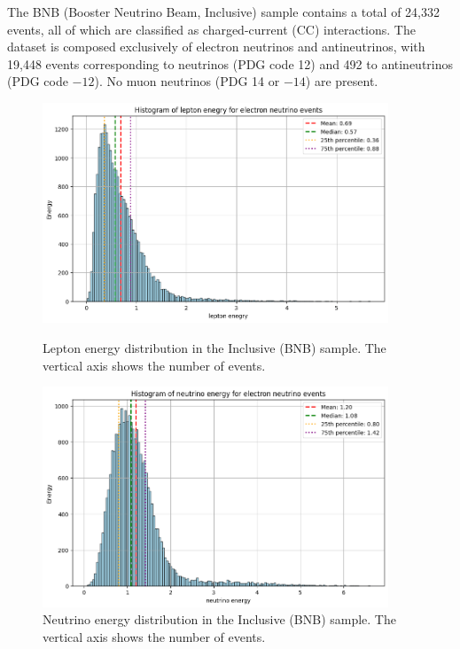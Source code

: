 \documentclass{pracalicmgr}
\begin{document}
The BNB (Booster Neutrino Beam, Inclusive) sample contains a total of 24,332 events, all of which are classified as charged-current (CC) interactions. The dataset is composed exclusively of electron neutrinos and antineutrinos, with 19,448 events corresponding to neutrinos (PDG code 12) and 492 to antineutrinos (PDG code $-12$). No muon neutrinos (PDG 14 or $-14$) are present.

\begin{figure}[H]
    \centering
    \begin{minipage}[t]{\textwidth}
    \centering
    \includegraphics[width=0.92\textwidth]{src/leptonElectron.png}
    \caption{Lepton energy distribution in the Inclusive (BNB) sample. The vertical axis shows the number of events.}
    \label{fig:lepton-inclusive}
    \end{minipage}
\begin{minipage}[t]{\textwidth}
        \centering
        \includegraphics[width=0.92\textwidth]{src/neutrinoElectron.png}
        \caption{Neutrino energy distribution in the Inclusive (BNB) sample. The vertical axis shows the number of events.}
        \label{fig:neutrino-inclusive}
        \end{minipage}
\end{figure}
\end{document}
